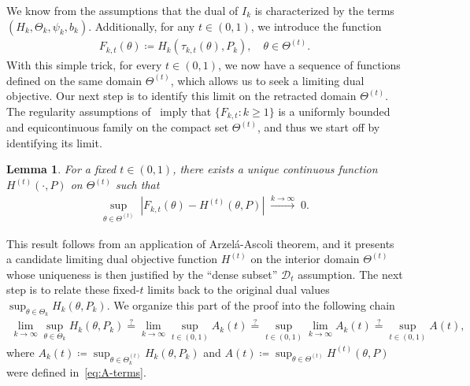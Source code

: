 \documentclass{article}
\theoremstyle{plain}
\newtheorem{lemma}[lemma]{Lemma}
\theoremstyle{definition}
\newcommand{\calD}{\mathcal D}
\begin{document}
We know from the assumptions that the dual  of $I_k$ is characterized by the terms $(H_k, \Theta_k, \psi_k, b_k)$. Additionally, for any $t \in (0,1)$, we introduce the function 
\begin{align}
    F_{k,t}(\theta) \coloneqq H_k(\tau_{k,t}(\theta), P_k), \quad \theta \in \Theta^{(t)}. 
\end{align}
With this simple trick, for every $t \in (0,1)$, we now have a sequence of functions defined on the same  domain $\Theta^{(t)}$, which allows us to seek a limiting dual objective. Our next step is to identify this limit on the retracted domain $\Theta^{(t)}$. The regularity assumptions of~ imply that $\{F_{k,t}: k \geq 1\}$ is a uniformly bounded and equicontinuous family on the compact set $\Theta^{(t)}$, and thus we start off by identifying its limit. 
\begin{lemma}
    \label{lemma:approx-constraint-limiting-1} For a fixed  $t \in (0, 1)$, there exists a unique continuous function $H^{(t)}(\cdot, P)$ on $\Theta^{(t)}$ such that 
    \begin{align}
        \sup_{\theta \in \Theta^{(t)}} \; \left\lvert F_{k, t}(\theta) - H^{(t)}(\theta, P) \right\rvert \; \stackrel{k \to \infty}{\longrightarrow} \; 0. 
    \end{align}
\end{lemma}
This result follows from an application of Arzel\'a-Ascoli theorem, and it presents a candidate limiting dual objective function $H^{(t)}$ on the interior domain $\Theta^{(t)}$ whose uniqueness is then justified by the   ``dense subset'' $\calD_t$ assumption. 
The next step is to relate these fixed-$t$ limits back to the original dual values $\sup_{\theta \in \Theta_k} H_k(\theta, P_k)$. We organize this part of the proof into the following chain
\begin{align}
    \lim_{k \to \infty} \sup_{\theta \in \Theta_k} H_k(\theta, P_k) \stackrel{?}{=} \lim_{k \to \infty} \sup_{t \in (0,1)} A_k(t) \stackrel{?}{=} \sup_{t \in (0,1)} \lim_{k \to \infty} A_k(t) \stackrel{?}{=} \sup_{t \in (0,1)}  A(t),      \label{eq:approx-constraint-proof-1}
\end{align}
where $A_k(t)  \coloneqq \sup_{\theta \in \Theta_k^{(t)}}H_k(\theta, P_k)$ and $A(t) \coloneqq \sup_{\theta \in \Theta^{(t)}}H^{(t)}(\theta, P)$ were defined in~\eqref{eq:A-terms}. 
\end{document}
